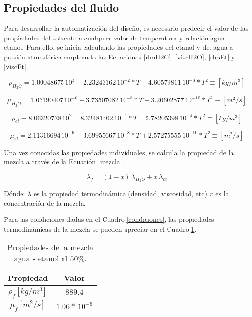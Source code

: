 \subsection{Propiedades del fluido}

\noindent
\justify

Para desarrollar la automatizaci\'on del dise\~no, es necesario predecir el valor de las propiedades del solvente a cualquier valor de temperatura y relaci\'on agua - etanol. Para ello, se inicia calculando las propiedades del etanol y del agua a presi\'on atmosf\'erica empleando las Ecuaciones \ref{rhoH2O}. \ref{viscH2O}, \ref{rhoEt} y \ref{viscEt}.

\begin{equation}
	\rho _{H_2O} = 1.00048675 \, 10^3 - 2.23243162 \, 10^{-2}*T - 4.60579811 \, 10^{-3}*T^2 \equiv \left[ kg / m^3 \right] 
	\label{rhoH2O}
\end{equation}

\begin{equation}
	\mu _{H_2O} = 1.63190407 \, 10^{-6} - 3.73507082 \, 10^{-8}*T + 3.20602877 \, 10^{-10}*T^2 \equiv \left[ m^2 / s \right] 
	\label{viscH2O}
\end{equation}


\begin{equation}
	\rho _{et} = 8.06320738 \, 10^{2}-8.32481402 \, 10^{-1}*T-5.78205398 \, 10^{-4}*T^2 \equiv \left[ kg / m^3 \right] 
	\label{rhoEt}
\end{equation}

\begin{equation}
	\mu _{et} = 2.11316694 \, 10^{-6} - 3.69955667 \, 10^{-8}*T + 2.57275555 \, 10^{-10}*T^2 \equiv \left[ m^2 / s \right] 
	\label{viscEt}
\end{equation}

\noindent
\justify

Una vez conocidas las propiedades individuales, se calcula la propiedad de la mezcla a trav\'es de la Ecuaci\'on \ref{mezcla}.

\begin{equation}
	\lambda _f = (1-x) \, \lambda _{H_2O} + x \, \lambda _{et}
	\label{mezcla}
\end{equation}

\noindent
\justify

D\'onde: $\lambda$ es la propiedad termodin\'amica (densidad, viscosidad, etc) $x$ es la concentraci\'on de la mezcla.

\noindent
\justify

Para las condiciones dadas en el Cuadro \ref{condiciones}, las propiedades termodin\'amicas de la mezcla se pueden apreciar en el Cuadro \ref{temoM}.

\begin{table}[h!]
	\centering
	\begin{tabular}{|c|c|}
	\hline
	\textbf{Propiedad} & \textbf{Valor} \\ \hline
	$\rho _f \left[ kg / m^3 \right]$ & $889.4$ \\ \hline
	$\mu _f \left[ m^2 / s \right] $ & $1.06 * \, 10^{-6}$ \\ \hline
	\end{tabular}
	\caption{Propiedades de la mezcla agua - etanol al $50 \%$.}
	\label{temoM}
\end{table}